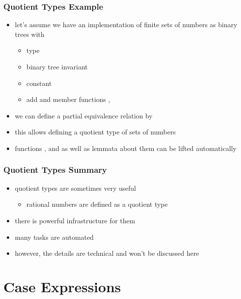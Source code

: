 \begin{frame}
\frametitle{Quotient Types Example}

\begin{itemize}
\item let's assume we have an implementation of finite sets of numbers as
binary trees with
\begin{itemize}
\item type 
\item binary tree invariant 
\item constant 
\item add and member functions ,\\ 
\end{itemize}
\item we can define a partial equivalence relation by\\
\item this allows defining a quotient type of sets of numbers
\item functions ,  and  as well as lemmata about them can be lifted automatically
\end{itemize}
\end{frame}


\begin{frame}
\frametitle{Quotient Types Summary}

\begin{itemize}
\item quotient types are sometimes very useful
\begin{itemize}
\item \eg rational numbers are defined as a quotient type
\end{itemize}
\item there is powerful infrastructure for them
\item many tasks are automated
\item however, the details are technical and won't be discussed here
\end{itemize}

\end{frame}

\section{Case Expressions}

